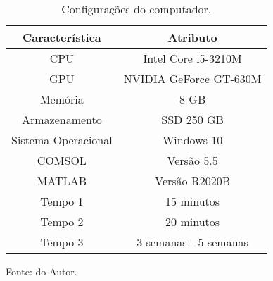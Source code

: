 



\begin{table}[H]
    \centering
    \caption{Configurações do computador.}
\begin{tabular}{cc}
\hline
Característica        & Atributo               \\ \hline
CPU                   & Intel Core i5-3210M    \\
GPU                   & NVIDIA GeForce GT-630M \\
Memória               & 8 GB                   \\
Armazenamento         & SSD 250 GB             \\
Sistema Operacional   & Windows 10             \\
COMSOL                & Versão 5.5             \\
MATLAB                & Versão R2020B          \\
Tempo 1               & 15 minutos             \\
Tempo 2               & 20 minutos             \\
Tempo 3               & 3 semanas - 5 semanas  \\ \hline
\end{tabular}

    \label{tab: ConfigPC}

    \vspace{2.5mm}
    Fonte: do Autor.

\end{table}